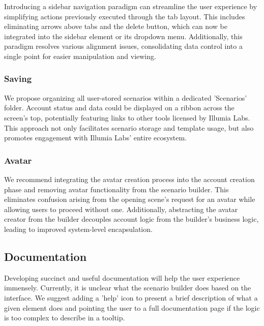 \documentclass[sigart]{acmart_mod} %
\begin{document}
Introducing a sidebar navigation paradigm can streamline the user experience by simplifying actions previously executed through the tab layout. This includes eliminating arrows above tabs and the delete button, which can now be integrated into the sidebar element or its dropdown menu. Additionally, this paradigm resolves various alignment issues, consolidating data control into a single point for easier manipulation and viewing.

\subsubsection{Saving}

We propose organizing all user-stored scenarios within a dedicated 'Scenarios' folder. Account status and data could be displayed on a ribbon across the screen's top, potentially featuring links to other tools licensed by Illumia Labs. This approach not only facilitates scenario storage and template usage, but also promotes engagement with Illumia Labs' entire ecosystem.

\subsubsection{Avatar}

We recommend integrating the avatar creation process into the account creation phase and removing avatar functionality from the scenario builder. This eliminates confusion arising from the opening scene's request for an avatar while allowing users to proceed without one. Additionally, abstracting the avatar creator from the builder decouples account logic from the builder's business logic, leading to improved system-level encapsulation.

\subsection{Documentation}

Developing succinct and useful documentation will help the user experience immensely. Currently, it is unclear what the scenario builder does based on the interface. We suggest adding a 'help' icon to present a brief description of what a given element does and pointing the user to a full documentation page if the logic is too complex to describe in a tooltip.
\end{document}
